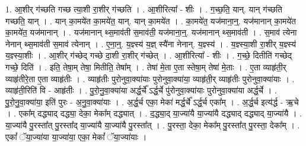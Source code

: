 \documentclass[17pt]{extarticle}
\begin{document}
1. आ॒शीर् ग॑च्छति गच्छ त्या॒शी रा॒शीर् ग॑च्छति । . आ॒शीरित्या᳚ - शीः । . ग॒च्छ॒ति॒ यान्. यान् ग॑च्छति गच्छति॒ यान् । . यान् का॒मये॑त का॒मये॑त॒ यान्. यान् का॒मये॑त । . का॒मये॑त॒ यज॑माना॒न्॒. यज॑मानान् का॒मये॑त का॒मये॑त॒ यज॑मानान् । . यज॑मानान् थ्स॒माव॑ती स॒माव॑ती॒ यज॑माना॒न्॒. यज॑मानान् थ्स॒माव॑ती । . स॒माव॑ त्येना नेनान् थ्स॒माव॑ती स॒माव॑ त्येनान् । . ए॒ना॒न्॒. य॒ज्ञ्स्य॑ य॒ज्ञ् स्यै॑ना नेनान्. य॒ज्ञ्स्य॑ । . य॒ज्ञ्स्या॒शी रा॒शीर् य॒ज्ञ्स्य॑ य॒ज्ञ्स्या॒शीः । . आ॒शीर् ग॑च्छेद् गच्छे दा॒शी रा॒शीर् ग॑च्छेत् । . आ॒शीरित्या᳚ - शीः । . ग॒च्छे॒ दितीति॑ गच्छेद् गच्छे॒ दिति॑ । . इति॒ तेषा॒म् तेषा॒ मितीति॒ तेषा᳚म् । . तेषा॑ मे॒ता ए॒ता स्तेषा॒म् तेषा॑ मे॒ताः । . ए॒ता व्याहृ॑ती॒र् व्याहृ॑तीरे॒ता ए॒ता व्याहृ॑तीः । . व्याहृ॑तीः पुरोनुवा॒क्या॑याः पुरोनुवा॒क्या॑या॒ व्याहृ॑ती॒र् व्याहृ॑तीः पुरोनुवा॒क्या॑याः । . व्याहृ॑ती॒रिति॑ वि - आहृ॑तीः । . पु॒रो॒नु॒वा॒क्या॑या अर्द्ध॒र्चे᳚ ऽर्द्ध॒र्चे पु॑रोनुवा॒क्या॑याः पुरोनुवा॒क्या॑या अर्द्ध॒र्चे । . पु॒रो॒नु॒वा॒क्या॑या॒ इति॑ पुरः - अ॒नु॒वा॒क्या॑याः । . अ॒र्द्ध॒र्च एका॒ मेका॑ मर्द्ध॒र्चे᳚ ऽर्द्ध॒र्च एका᳚म् । . अ॒र्द्ध॒र्च इत्य॑र्द्ध - ऋ॒चे । . एका᳚म् दद्ध्याद् दद्ध्या॒ देका॒ मेका᳚म् दद्ध्यात् । . द॒द्ध्या॒द् या॒ज्या॑यै या॒ज्या॑यै दद्ध्याद् दद्ध्याद् या॒ज्या॑यै । . या॒ज्या॑यै पु॒रस्ता᳚त् पु॒रस्ता᳚द् या॒ज्या॑यै या॒ज्या॑यै पु॒रस्ता᳚त् । . पु॒रस्ता॒ देका॒ मेका᳚म् पु॒रस्ता᳚त् पु॒रस्ता॒ देका᳚म् । . एकां᳚ ॅया॒ज्या॑या या॒ज्या॑या॒ एका॒ मेकां᳚ ॅया॒ज्या॑याः । \newline
\end{document}
